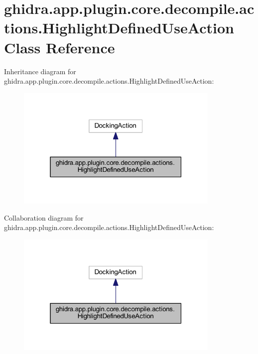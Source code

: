 \hypertarget{classghidra_1_1app_1_1plugin_1_1core_1_1decompile_1_1actions_1_1_highlight_defined_use_action}{}\section{ghidra.\+app.\+plugin.\+core.\+decompile.\+actions.\+Highlight\+Defined\+Use\+Action Class Reference}
\label{classghidra_1_1app_1_1plugin_1_1core_1_1decompile_1_1actions_1_1_highlight_defined_use_action}


Inheritance diagram for ghidra.\+app.\+plugin.\+core.\+decompile.\+actions.\+Highlight\+Defined\+Use\+Action\+:
\nopagebreak
\begin{figure}[H]
\begin{center}
\leavevmode
\includegraphics[width=277pt]{classghidra_1_1app_1_1plugin_1_1core_1_1decompile_1_1actions_1_1_highlight_defined_use_action__inherit__graph}
\end{center}
\end{figure}


Collaboration diagram for ghidra.\+app.\+plugin.\+core.\+decompile.\+actions.\+Highlight\+Defined\+Use\+Action\+:
\nopagebreak
\begin{figure}[H]
\begin{center}
\leavevmode
\includegraphics[width=277pt]{classghidra_1_1app_1_1plugin_1_1core_1_1decompile_1_1actions_1_1_highlight_defined_use_action__coll__graph}
\end{center}
\end{figure}
